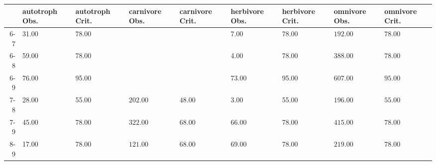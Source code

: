 \begin{table}[ht]
\centering
\begin{tabular}{rllllllll}
  \toprule
 & autotroph Obs. & autotroph Crit. & carnivore Obs. & carnivore Crit. & herbivore Obs. & herbivore Crit. & omnivore Obs. & omnivore Crit. \\ 
  \midrule
6-7 & 31.00 & 78.00 &  &  & 7.00 & 78.00 & \(\mathbf{192.00}\) & \(\mathbf{78.00}\) \\ 
  6-8 & 59.00 & 78.00 &  &  & 4.00 & 78.00 & \(\mathbf{388.00}\) & \(\mathbf{78.00}\) \\ 
  6-9 & 76.00 & 95.00 &  &  & 73.00 & 95.00 & \(\mathbf{607.00}\) & \(\mathbf{95.00}\) \\ 
  7-8 & 28.00 & 55.00 & \(\mathbf{202.00}\) & \(\mathbf{48.00}\) & 3.00 & 55.00 & \(\mathbf{196.00}\) & \(\mathbf{55.00}\) \\ 
  7-9 & 45.00 & 78.00 & \(\mathbf{322.00}\) & \(\mathbf{68.00}\) & 66.00 & 78.00 & \(\mathbf{415.00}\) & \(\mathbf{78.00}\) \\ 
  8-9 & 17.00 & 78.00 & \(\mathbf{121.00}\) & \(\mathbf{68.00}\) & 69.00 & 78.00 & \(\mathbf{219.00}\) & \(\mathbf{78.00}\) \\ 
   \bottomrule
\end{tabular}
\end{table}
